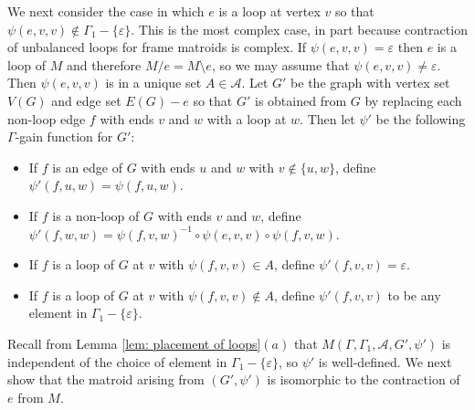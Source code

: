 \documentclass[12pt]{article}
\theoremstyle{definition}
\newcommand{\cA}{\mathcal{A}}
\newcommand{\ep}{\varepsilon}
\newcommand{\del}{\!\setminus\!}
\begin{document}
We next consider the case in which $e$ is a loop at vertex $v$ so that $\psi(e, v, v) \notin \Gamma_1 - \{\ep\}$.
This is the most complex case, in part because contraction of unbalanced loops for frame matroids is complex.
If $\psi(e,v,v) = \ep$ then $e$ is a loop of $M$ and therefore $M/e = M\del e$, so we may assume that $\psi(e,v,v) \ne \ep$.
Then $\psi(e, v, v)$ is in a unique set $A \in \cA$.
Let $G'$ be the graph with vertex set $V(G)$ and edge set $E(G) - e$ so that $G'$ is obtained from $G$ by replacing each non-loop edge $f$ with ends $v$ and $w$ with a loop at $w$.
Then let $\psi'$ be the following $\Gamma$-gain function for $G'$:
\begin{itemize}
    \item If $f$ is an edge of $G$ with ends $u$ and $w$ with $v \notin \{u,w\}$, define $\psi'(f, u, w) = \psi(f, u, w)$.

    \item If $f$ is a non-loop of $G$ with ends $v$ and $w$, define $\psi'(f, w, w) = \psi(f, v, w)^{-1} \circ \psi(e, v, v) \circ \psi(f, v, w)$.
    
    \item If $f$ is a loop of $G$ at $v$ with $\psi(f, v, v) \in A$, define $\psi'(f, v, v) = \ep$.

    \item If $f$ is a loop of $G$ at $v$ with $\psi(f, v, v) \notin A$, define $\psi'(f, v, v)$ to be any element in $\Gamma_1 - \{\ep\}$.
\end{itemize}
Recall from Lemma \ref{lem: placement of loops}$(a)$ that $M(\Gamma, \Gamma_1, \cA, G', \psi')$ is independent of the choice of element in $\Gamma_1 - \{\ep\}$, so $\psi'$ is well-defined.
We next show that the matroid arising from $(G', \psi')$ is isomorphic to the contraction of $e$ from $M$.
\end{document}
